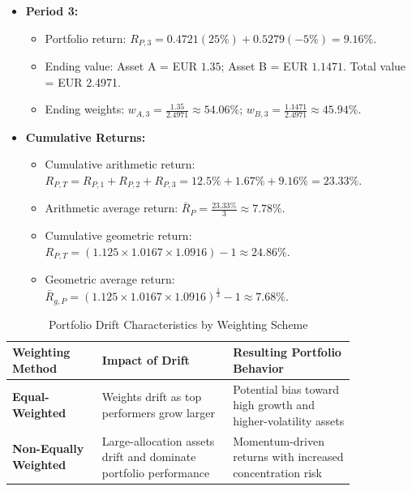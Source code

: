 \begin{tcolorbox}
\begin{itemize}
\begin{itemize}
	      \end{itemize}
	\item \textbf{Period 3:}
	      \begin{itemize}
		      \item Portfolio return: $R_{P,3} = 0.4721(25\%) + 0.5279(-5\%) = 9.16\%$.
		      \item Ending value: Asset A = EUR $1.35$; Asset B = EUR $1.1471$. Total value = EUR 2.4971.
		      \item Ending weights: $w_{A,3} = \frac{1.35}{2.4971} \approx 54.06\%$; $w_{B,3} = \frac{1.1471}{2.4971} \approx 45.94\%$.
	      \end{itemize}
	\item \textbf{Cumulative Returns:}
	      \begin{itemize}
		      \item Cumulative arithmetic return: $R_{P,T} = R_{P,1} + R_{P,2} + R_{P,3} = 12.5\% + 1.67\% + 9.16\% = 23.33\%$.
		      \item Arithmetic average return: $\bar{R}_P = \frac{23.33\%}{3} \approx 7.78\%$.
		      \item Cumulative geometric return: $R_{P,T} = (1.125 \times 1.0167 \times 1.0916) - 1 \approx 24.86\%$.
		      \item Geometric average return: $\bar{R}_{g,P} = (1.125 \times 1.0167 \times 1.0916)^{\frac{1}{3}} - 1 \approx 7.68\%$.
	      \end{itemize}
\end{itemize}
\end{tcolorbox}
\begin{table}[!htbp]
\centering
\caption{Portfolio Drift Characteristics by Weighting Scheme}
\label{tab:portfolio_drift_comparison_m8}
\begin{tabular}{p{0.22\linewidth}  p{0.32\linewidth}  p{0.30\linewidth}}
	\toprule
	\textbf{Weighting Method} & \textbf{Impact of Drift} & \textbf{Resulting Portfolio Behavior} \\
	\midrule
	\textbf{Equal-Weighted} & Weights drift as top performers grow larger & Potential bias toward high growth and higher-volatility assets \\
	\midrule
	\textbf{Non-Equally Weighted} & Large-allocation assets drift and dominate portfolio performance & Momentum-driven returns with increased concentration risk \\
	\bottomrule
\end{tabular}
\end{table}
